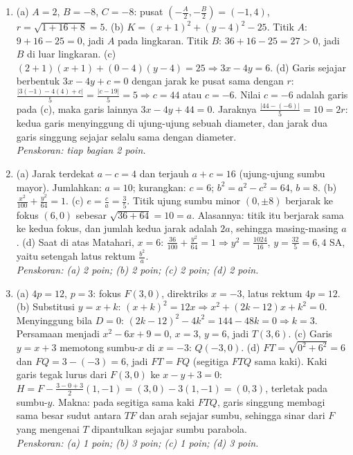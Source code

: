 \documentclass[a4paper,11pt]{article}
\newcounter{no}
\begin{document}
\small\begin{enumerate}[leftmargin=2em,itemsep=3pt,topsep=2pt]
\item[\textbf{1.}] (a) $A=2$, $B=-8$, $C=-8$: pusat $\left(-\frac A2,-\frac B2\right)=(-1,4)$, $r=\sqrt{1+16+8}=5$. (b) $K=(x+1)^2+(y-4)^2-25$. Titik $A$: $9+16-25=0$, jadi $A$ pada lingkaran. Titik $B$: $36+16-25=27>0$, jadi $B$ di luar lingkaran. (c) $(2+1)(x+1)+(0-4)(y-4)=25\Rightarrow3x-4y=6$. (d) Garis sejajar berbentuk $3x-4y+c=0$ dengan jarak ke pusat sama dengan $r$: $\frac{|3(-1)-4(4)+c|}5=\frac{|c-19|}5=5\Rightarrow c=44$ atau $c=-6$. Nilai $c=-6$ adalah garis pada (c), maka garis lainnya $3x-4y+44=0$. Jaraknya $\frac{|44-(-6)|}5=10=2r$: kedua garis menyinggung di ujung-ujung sebuah diameter, dan jarak dua garis singgung sejajar selalu sama dengan diameter. \\ \textit{Penskoran: tiap bagian 2 poin.}
\item[\textbf{2.}] (a) Jarak terdekat $a-c=4$ dan terjauh $a+c=16$ (ujung-ujung sumbu mayor). Jumlahkan: $a=10$; kurangkan: $c=6$; $b^2=a^2-c^2=64$, $b=8$. (b) $\frac{x^2}{100}+\frac{y^2}{64}=1$. (c) $e=\frac ca=\frac35$. Titik ujung sumbu minor $(0,\pm8)$ berjarak ke fokus $(6,0)$ sebesar $\sqrt{36+64}=10=a$. Alasannya: titik itu berjarak sama ke kedua fokus, dan jumlah kedua jarak adalah $2a$, sehingga masing-masing $a$. (d) Saat di atas Matahari, $x=6$: $\frac{36}{100}+\frac{y^2}{64}=1\Rightarrow y^2=\frac{1024}{16}$, $y=\frac{32}5=6{,}4$ SA, yaitu setengah latus rektum $\frac{b^2}a$. \\ \textit{Penskoran: (a) 2 poin; (b) 2 poin; (c) 2 poin; (d) 2 poin.}
\item[\textbf{3.}] (a) $4p=12$, $p=3$: fokus $F(3,0)$, direktriks $x=-3$, latus rektum $4p=12$. (b) Substitusi $y=x+k$: $(x+k)^2=12x\Rightarrow x^2+(2k-12)x+k^2=0$. Menyinggung bila $D=0$: $(2k-12)^2-4k^2=144-48k=0\Rightarrow k=3$. Persamaan menjadi $x^2-6x+9=0$, $x=3$, $y=6$, jadi $T(3,6)$. (c) Garis $y=x+3$ memotong sumbu-$x$ di $x=-3$: $Q(-3,0)$. (d) $FT=\sqrt{0^2+6^2}=6$ dan $FQ=3-(-3)=6$, jadi $FT=FQ$ (segitiga $FTQ$ sama kaki). Kaki garis tegak lurus dari $F(3,0)$ ke $x-y+3=0$: $H=F-\frac{3-0+3}{2}(1,-1)=(3,0)-3(1,-1)=(0,3)$, terletak pada sumbu-$y$. Makna: pada segitiga sama kaki $FTQ$, garis singgung membagi sama besar sudut antara $TF$ dan arah sejajar sumbu, sehingga sinar dari $F$ yang mengenai $T$ dipantulkan sejajar sumbu parabola. \\ \textit{Penskoran: (a) 1 poin; (b) 3 poin; (c) 1 poin; (d) 3 poin.}

\end{enumerate}
\end{document}
